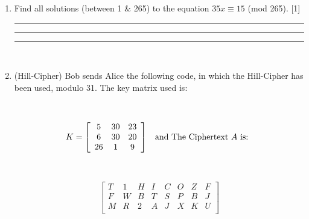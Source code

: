 \documentclass[12pt,emtex]{article}
\begin{document}
\begin{enumerate}
    \hrule

    \vspace{10mm}

    \hrule


\

	 \item  Find all solutions (between 1 \& 265) to the equation $35x \equiv 15$ (mod 265).         \hfill     [1]

	    \vspace{8mm}  \hrule	    \vspace{8mm}  \hrule	    \vspace{8mm}  \hrule
	    

\newpage

\

\vspace{-25mm}
          \item   (Hill-Cipher) Bob sends Alice the following code, in which the Hill-Cipher has been used, modulo 31. The key matrix used is:
    
          \vspace{-6mm}
            
            \
            
             	\[ K = 
            \left[
            	\begin{array}{cccccccccc}
                    5	&	30	& 	23 \\
                    6	&	30	& 	20 \\
                    26	&	1	&	9 \\
            \end{array}
            \right]
            \hspace{3mm}
             \mbox{and The Ciphertext $A$ is:  }
             \medskip
            \] 
          
          \
          
          \vspace{-6mm}
            
         \[  
            \left[
            \begin{array}{ccccccccccccccc}
T	&	1	&	H	&	I	&	C	&	O	&	Z	&	F	\\
F	&	W	&	B	&	T	&	S	&	P	&	B	&	J	\\
M	&	R	&	2	&	A	&	J	&	X	&	K	&	U	\\
           \end{array}
            \right]
            \]
            
                \medskip
           

\end{enumerate}
\end{document}
